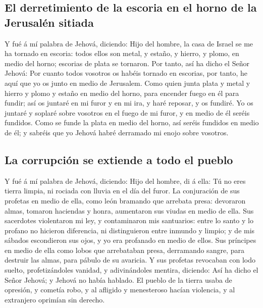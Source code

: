 \hypertarget{el-derretimiento-de-la-escoria-en-el-horno-de-la-jerusaluxe9n-sitiada}{%
\subsection{El derretimiento de la escoria en el horno de la Jerusalén
sitiada}\label{el-derretimiento-de-la-escoria-en-el-horno-de-la-jerusaluxe9n-sitiada}}

 Y fué á mí palabra de Jehová, diciendo: 
Hijo del hombre, la casa de Israel se me ha tornado en escoria: todos
ellos son metal, y estaño, y hierro, y plomo, en medio del horno;
escorias de plata se tornaron.  Por tanto, así ha dicho
el Señor Jehová: Por cuanto todos vosotros os habéis tornado en
escorias, por tanto, he aquí que yo os junto en medio de Jerusalem.
 Como quien junta plata y metal y hierro y plomo y estaño
en medio del horno, para encender fuego en él para fundir; así os
juntaré en mi furor y en mi ira, y haré reposar, y os fundiré.
 Yo os juntaré y soplaré sobre vosotros en el fuego de mi
furor, y en medio de él seréis fundidos.  Como se funde
la plata en medio del horno, así seréis fundidos en medio de él; y
sabréis que yo Jehová habré derramado mi enojo sobre vosotros.

\hypertarget{la-corrupciuxf3n-se-extiende-a-todo-el-pueblo}{%
\subsection{La corrupción se extiende a todo el
pueblo}\label{la-corrupciuxf3n-se-extiende-a-todo-el-pueblo}}

 Y fué á mí palabra de Jehová, diciendo: 
Hijo del hombre, di á ella: Tú no eres tierra limpia, ni rociada con
lluvia en el día del furor.  La conjuración de sus
profetas en medio de ella, como león bramando que arrebata presa:
devoraron almas, tomaron haciendas y honra, aumentaron sus viudas en
medio de ella.  Sus sacerdotes violentaron mi ley, y
contaminaron mis santuarios: entre lo santo y lo profano no hicieron
diferencia, ni distinguieron entre inmundo y limpio; y de mis sábados
escondieron sus ojos, y yo era profanado en medio de ellos.
 Sus príncipes en medio de ella como lobos que
arrebataban presa, derramando sangre, para destruir las almas, para
pábulo de su avaricia.  Y sus profetas revocaban con lodo
suelto, profetizándoles vanidad, y adivinándoles mentira, diciendo: Así
ha dicho el Señor Jehová; y Jehová no había hablado.  El
pueblo de la tierra usaba de opresión, y cometía robo, y al afligido y
menesteroso hacían violencia, y al extranjero oprimían sin derecho.

